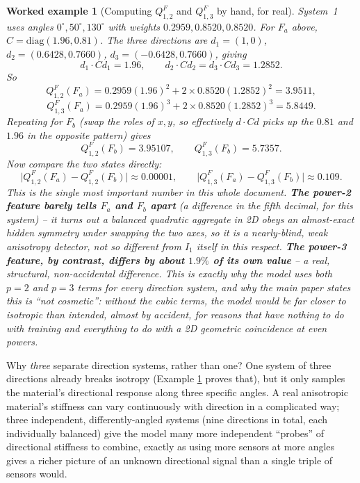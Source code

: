\documentclass[11pt,a4paper]{article}
\newtheorem{worked}{Worked example}
\begin{document}
\begin{worked}[Computing $Q^F_{1,2}$ and $Q^F_{1,3}$ by hand, for real]
\label{ex:worked-full}
System~1 uses angles $0^\circ,50^\circ,130^\circ$ with weights
$0.2959,0.8520,0.8520$. For $F_a$ above, $C=\mathrm{diag}(1.96,0.81)$.
The three directions are $d_1=(1,0)$, $d_2=(0.6428,0.7660)$,
$d_3=(-0.6428,0.7660)$, giving
\[
 d_1\cdot Cd_1=1.96,\qquad d_2\cdot Cd_2=d_3\cdot Cd_3=1.2852 .
\]
So
\[
 Q^F_{1,2}(F_a)=0.2959(1.96)^2+2\times0.8520(1.2852)^2=3.9511,
\]
\[
 Q^F_{1,3}(F_a)=0.2959(1.96)^3+2\times0.8520(1.2852)^3=5.8449.
\]
Repeating for $F_b$ (swap the roles of $x,y$, so effectively
$d\cdot Cd$ picks up the $0.81$ and $1.96$ in the opposite pattern)
gives
\[
 Q^F_{1,2}(F_b)=3.95107,\qquad Q^F_{1,3}(F_b)=5.7357.
\]
Now compare the two states directly:
\[
 \big|Q^F_{1,2}(F_a)-Q^F_{1,2}(F_b)\big| \approx 0.00001,
 \qquad
 \big|Q^F_{1,3}(F_a)-Q^F_{1,3}(F_b)\big| \approx 0.109 .
\]
This is the single most important number in this whole document.
\textbf{The power-2 feature barely tells $F_a$ and $F_b$ apart}
(a difference in the fifth decimal, for this system) -- it turns out a
balanced \emph{quadratic} aggregate in 2D obeys an almost-exact hidden
symmetry under swapping the two axes, so it is a nearly-blind, weak
anisotropy detector, not so different from $I_1$ itself in this
respect. \textbf{The power-3 feature, by contrast, differs by about
$1.9\%$ of its own value} -- a real, structural, non-accidental
difference. This is exactly why the model uses both $p=2$ and $p=3$
terms for every direction system, and why the main paper states this
is ``not cosmetic'': without the cubic terms, the model would be far
closer to isotropic than intended, almost by accident, for reasons that
have nothing to do with training and everything to do with a 2D
geometric coincidence at even powers.
\end{worked}

Why \emph{three} separate direction systems, rather than one? One
system of three directions already breaks isotropy (Example
\ref{ex:worked-full} proves that), but it only samples the material's
directional response along three specific angles. A real anisotropic
material's stiffness can vary continuously with direction in a
complicated way; three independent, differently-angled systems (nine
directions in total, each individually balanced) give the model many
more independent ``probes'' of directional stiffness to combine,
exactly as using more sensors at more angles gives a richer picture of
an unknown directional signal than a single triple of sensors would.
\end{document}
